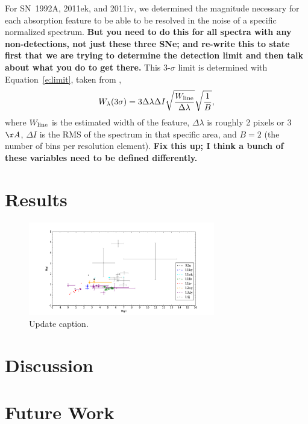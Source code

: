 \documentclass[useAMS,usenatbib]{mn2e}
\begin{document}
For SN~1992A, 2011ek, and 2011iv, we determined the magnitude necessary for each absorption feature to be able to be resolved in the noise of a specific normalized spectrum. {\bf But you need to do this for all spectra with any non-detections, not just these three SNe; and re-write this to state first that we are trying to determine the detection limit and then talk about what you do to get there.}  This 3-$\sigma$ limit is determined with Equation~\ref{e:limit}, taken from \citep{Leonard01},
\begin{equation}
W_{\lambda}(3\sigma) = 3 \Delta \lambda \Delta I \sqrt{\frac{W_{\rm line}}{\Delta \lambda}} \sqrt{\frac{1}{B}},
\end{equation}\label{e:limit}
where $W_{\rm line}$ is the estimated width of the feature, $\Delta \lambda$ is roughly 2 pixels or 3 $\AA$, $\Delta I$ is the RMS of the spectrum in that specific area, and $B = 2$ (the number of bins per resolution element). {\bf Fix this up; I think a bunch of these variables need to be defined differently.}

\section{Results}\label{s:results}

\begin{figure}
\begin{center}
\includegraphics[angle=0,width=3.2in]{mgi_vs_mgii}
\caption{Update caption.}\label{f:lc}
\end{center}
\end{figure}

\section{Discussion}\label{s:disc}

\section{Future Work}\label{s:fw}
\end{document}
